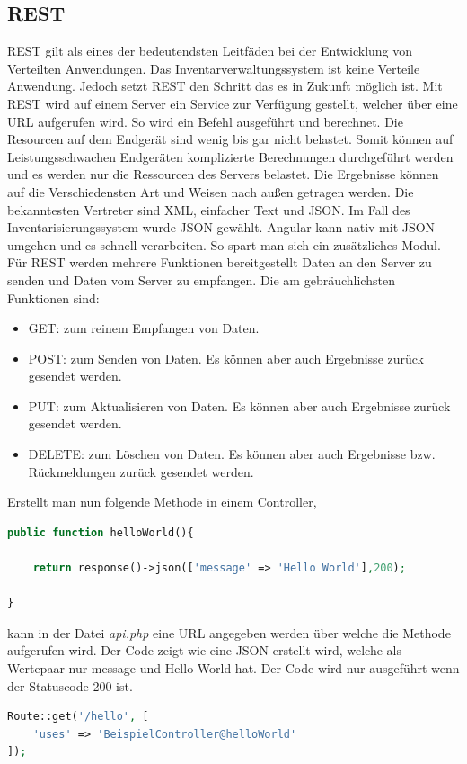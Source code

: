 \subsection{REST}
\acl{REST} gilt als eines der bedeutendsten Leitfäden bei der Entwicklung von Verteilten Anwendungen. \autocite{Nguyen.2017} Das Inventarverwaltungssystem ist keine Verteile Anwendung. Jedoch setzt \ac{REST} den Schritt das es in Zukunft möglich ist. Mit \ac{REST} wird auf einem Server ein Service zur Verfügung gestellt, welcher über eine \ac{URL} aufgerufen wird. So wird ein Befehl ausgeführt und berechnet. Die Resourcen auf dem Endgerät sind wenig bis gar nicht belastet. Somit können auf Leistungsschwachen Endgeräten komplizierte Berechnungen durchgeführt werden und es werden nur die Ressourcen des Servers belastet. Die Ergebnisse können auf die Verschiedensten Art und Weisen nach außen getragen werden. Die bekanntesten Vertreter sind \ac{XML}, einfacher Text und \ac{JSON}. Im Fall des Inventarisierungssystem wurde JSON gewählt. Angular kann nativ mit JSON umgehen und es schnell verarbeiten. So spart man sich ein zusätzliches Modul.
Für \ac{REST} werden mehrere Funktionen bereitgestellt Daten an den Server zu senden und Daten vom Server zu empfangen. Die am gebräuchlichsten Funktionen sind:

\begin{itemize}
	\item GET: zum reinem Empfangen von Daten.
	
	\item POST: zum Senden von Daten. Es können aber auch Ergebnisse zurück gesendet werden. 
	
	\item PUT:  zum Aktualisieren von Daten. Es können aber auch Ergebnisse zurück gesendet werden.
	
	\item DELETE:  zum Löschen von Daten. Es können aber auch Ergebnisse bzw. Rückmeldungen zurück gesendet werden.
\end{itemize}


Erstellt man nun folgende Methode in einem Controller,

\begin{lstlisting}[language=php, frame=single]
public function helloWorld(){

	return response()->json(['message' => 'Hello World'],200);

}
\end{lstlisting}

kann in der Datei \textit{api.php} eine \ac{URL} angegeben werden über welche die Methode aufgerufen wird. Der Code zeigt wie eine \ac{JSON} erstellt wird, welche als Wertepaar nur message und Hello World hat. Der Code wird nur ausgeführt wenn der Statuscode 200 ist.
 \begin{lstlisting}[language=php, frame=single]
Route::get('/hello', [
	'uses' => 'BeispielController@helloWorld'
]);
\end{lstlisting}

